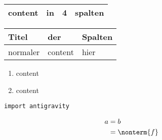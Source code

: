 \begin{tabularx}{\textwidth}{|X|X|X|X|}
	\hline
    content & in & 4 & spalten \\
    \hline
\end{tabularx}

\begin{longtable}{*{3}{|p{2cm}}|}
	\hline
	\textbf{Titel} & \textbf{der} & \textbf{Spalten} \\
    \hline
    \endhead
    normaler & content & hier \\
    \hline
\end{longtable}

\begin{enumerate}[nolistsep, noitemsep, label=\alph*)]
	\item content
    \item content
\end{enumerate}

\begin{verbatim}
import antigravity
\end{verbatim}

\newcommand{\schriftgroessenname}{\fontsize{8.5pt}{10.2pt}}

\begin{align*}
	a &= b \\
    &= \nonterm{f}
\end{align*}

\nuffsaid











